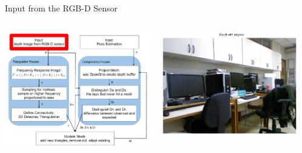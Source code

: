 \documentclass{beamer}
\begin{document}
\begin{frame}{Input from the RGB-D Sensor}
\vspace{-.1in}
\begin{columns}
  \begin{center}
  \includegraphics[width=\textwidth]{SDinput.pdf} 
  \end{center}
  \begin{center}
  \includegraphics[width=\textwidth]{m_photo.pdf} 
  \end{center}
  \begin{center}

\end{center}
\end{columns}
\end{frame}
\end{document}
